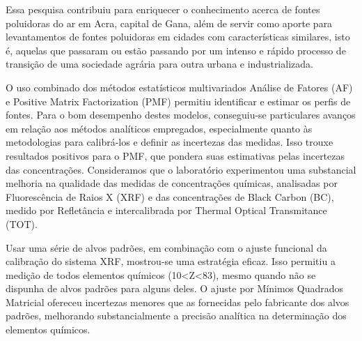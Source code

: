  
Essa pesquisa contribuiu para enriquecer o conhecimento acerca de fontes poluidoras do ar em Acra, capital de Gana, além de servir como aporte para levantamentos de fontes poluidoras em cidades com características similares, isto é, aquelas que passaram ou estão passando por um intenso e rápido processo de transição de uma sociedade agrária para outra urbana e industrializada.%
%
%  

O uso combinado dos métodos estatísticos multivariados Análise de Fatores (AF) e Positive Matrix Factorization (PMF) permitiu identificar e estimar os perfis de fontes. Para o bom desempenho destes modelos, conseguiu-se particulares avanços em relação aos métodos analíticos empregados, especialmente quanto às metodologias para calibrá-los e definir as incertezas das medidas. Isso trouxe resultados positivos para o PMF, que pondera suas estimativas pelas incertezas das concentrações. Consideramos que o laboratório experimentou uma substancial melhoria na qualidade das medidas de concentrações químicas, analisadas por Fluorescência de Raios X (XRF) e das concentrações de Black Carbon (BC), medido por Refletância e intercalibrada por Thermal Optical Transmitance (TOT). 

Usar uma série de alvos padrões, em combinação com o ajuste funcional da calibração do sistema XRF, mostrou-se uma estratégia eficaz. Isso permitiu a medição de todos elementos químicos (10<Z<83), mesmo quando não se dispunha de alvos padrões para alguns deles. O ajuste por Mínimos Quadrados Matricial ofereceu incertezas menores que as fornecidas pelo fabricante dos alvos padrões, melhorando substancialmente a precisão analítica na determinação dos elementos químicos.

